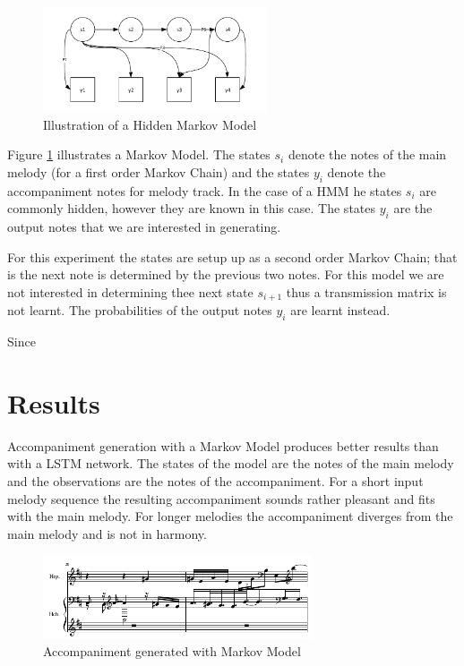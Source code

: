 \begin{figure}
\centerline{\includegraphics[width=250px]{../images/hmm_illu.pdf}}
\caption{Illustration of a Hidden Markov Model}
\label{ims:hmm_illu}
\end{figure}

Figure \ref{ims:hmm_illu} illustrates a Markov Model. The states $s_i$ denote the notes of the main melody (for a first order Markov Chain) and the states $y_i$ denote the accompaniment notes for melody track. In the case of a \ac{HMM} he states $s_i$ are commonly hidden, however they are known in this case. The states $y_i$ are the output notes that we are interested in generating. 

For this experiment the states are setup up as a second order Markov Chain; that is the next note is determined by the previous two notes. For this model we are not interested in determining thee next state $s_{i+1}$ thus a transmission matrix is not learnt. The probabilities of the output notes $y_i$ are learnt instead.

Since 

\section{Results}
Accompaniment generation with a Markov Model produces better results than with a \ac{LSTM} network. The states of the model are the notes of the main melody and the observations are the notes of the accompaniment. For a short input melody sequence the resulting accompaniment sounds rather pleasant and fits with the main melody. For longer melodies the accompaniment diverges from the main melody and is not in harmony.

\begin{figure}
\centerline{\includegraphics[width=300px]{../images/markov_model_accomp.pdf}}
\caption{Accompaniment generated with Markov Model}
\label{ims:hmm_accomp}
\end{figure}


